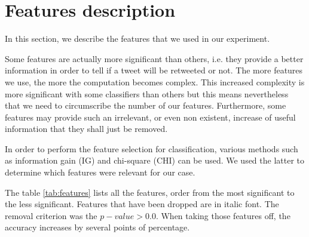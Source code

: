 \section{Features description}
\label{sec:features}

In this section, we describe the features that we used in our experiment.

Some features are actually more significant than others, i.e. they provide a 
better information in order to tell if a tweet will be retweeted or not.
The more features we use, the more the computation becomes 
complex. This increased complexity is more significant with some classifiers 
than others but this means nevertheless that we need to circumscribe the number 
of our features. Furthermore, some features may provide such an irrelevant, or 
even non existent, increase of useful information that they shall just be 
removed.

In order to perform the feature selection for classification, various methods 
such as information gain (IG) and chi-square (CHI) can be used. We used the 
latter to determine which features were relevant for our case.

The table \ref{tab:features} lists all the features, order from the most 
significant to the less significant. Features that have been dropped are in 
italic font. The removal criterion was the $p-value>0.0$. When taking those 
features off, the accuracy increases by several points of percentage.

